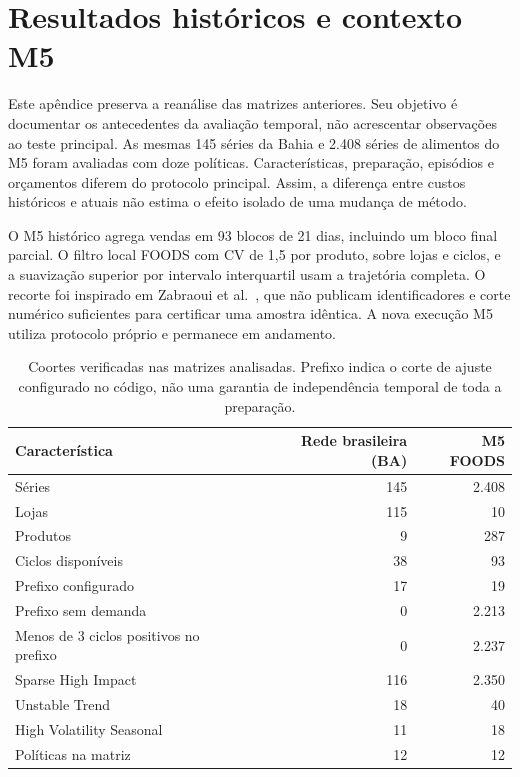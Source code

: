 \section{Resultados históricos e contexto M5}
\label{app:historical}

Este apêndice preserva a reanálise das matrizes anteriores. Seu objetivo é documentar os antecedentes da avaliação temporal, não acrescentar observações ao teste principal. As mesmas 145 séries da Bahia e 2.408 séries de alimentos do M5 foram avaliadas com doze políticas. Características, preparação, episódios e orçamentos diferem do protocolo principal. Assim, a diferença entre custos históricos e atuais não estima o efeito isolado de uma mudança de método.

O M5 histórico agrega vendas em 93 blocos de 21 dias, incluindo um bloco final parcial. O filtro local FOODS com CV de 1,5 por produto, sobre lojas e ciclos, e a suavização superior por intervalo interquartil usam a trajetória completa. O recorte foi inspirado em Zabraoui et al.\ \cite{sca_27e994c54848}, que não publicam identificadores e corte numérico suficientes para certificar uma amostra idêntica. A nova execução M5 utiliza protocolo próprio e permanece em andamento.

\begin{table}[htbp]
\centering\small
\caption{Coortes verificadas nas matrizes analisadas. Prefixo indica o corte de ajuste configurado no código, não uma garantia de independência temporal de toda a preparação.}\label{tab:cohort}
\begin{tabular}{lrr}
\toprule
Característica & Rede brasileira (BA) & M5 FOODS\\
\midrule
Séries & 145 & 2.408\\
Lojas & 115 & 10\\
Produtos & 9 & 287\\
Ciclos disponíveis & 38 & 93\\
Prefixo configurado & 17 & 19\\
Prefixo sem demanda & 0 & 2.213\\
Menos de 3 ciclos positivos no prefixo & 0 & 2.237\\
Sparse High Impact & 116 & 2.350\\
Unstable Trend & 18 & 40\\
High Volatility Seasonal & 11 & 18\\
Políticas na matriz & 12 & 12\\
\bottomrule
\end{tabular}
\end{table}

